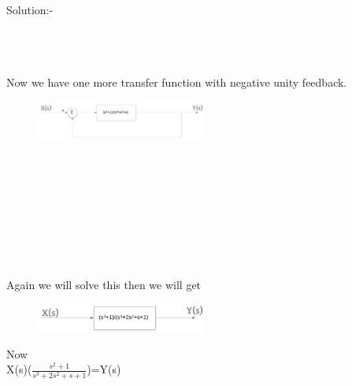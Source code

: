 \documentclass[journal,12pt,twocolumn]{IEEEtran}
\begin{document}
\begin{frame}{Solution:- }
\begin{figure}[h]
\end{figure}
\\\\\\
Now we have one more transfer function with negative unity feedback.
\begin{figure}[h]
\includegraphics[width=0.5\textwidth]{./figs/pic6.png}
\end{figure}
\\\\\\\\\\\\\\\\
Again we will solve this then we will get
\begin{figure}[h]
\includegraphics[width=0.5\textwidth]{./figs/pic8.png}
\end{figure}

Now\\

X(s)($\frac{s^2+1}{s^3+2s^2+s+1}$)=Y(s)\\


\end{frame}
\end{document}
